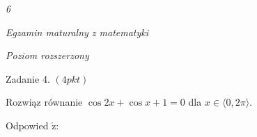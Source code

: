 \documentclass[a4paper,12pt]{article}
\begin{document}
{\it 6}

{\it Egzamin maturalny z matematyki}

{\it Poziom rozszerzony}

Zadanie 4. $(4pkt)$

Rozwiąz równanie $\cos 2x+\cos x+1=0$ dla $x\in\langle 0,2\pi\rangle.$

Odpowied $\acute{\mathrm{z}}$:
\end{document}
